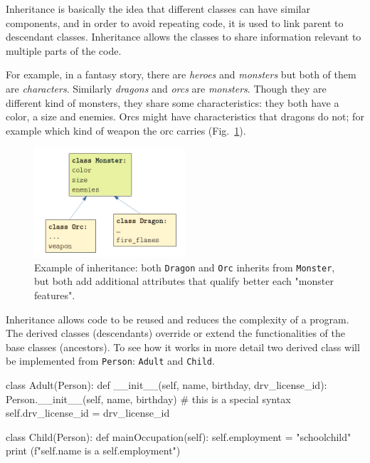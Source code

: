 Inheritance is basically the idea that different classes can have similar components, and in order to avoid repeating code, it is used to link parent to descendant classes. Inheritance allows the classes to share information relevant to multiple parts of the code.

For example, in a fantasy story, there are \emph{heroes} and \emph{monsters} but both of them are \emph{characters}. Similarly \emph{dragons} and \emph{orcs} are \emph{monsters}. Though they are different kind of monsters, they share some characteristics: they both have a color, a size and enemies. Orcs might have characteristics that dragons do not; for example which kind of weapon the orc carries (Fig.~\ref{fig:inheritance}). 

\begin{figure}[htbp]
  \centering
  \includegraphics[width=0.5\textwidth]{figures/inheritance}
  \caption{Example of inheritance: both \texttt{Dragon} and \texttt{Orc} inherits from \texttt{Monster}, but both add additional attributes that qualify better each "monster features".}
  \label{fig:inheritance}
\end{figure}

Inheritance allows code to be reused and reduces the complexity of a program. The derived classes (descendants) override or extend the functionalities of the base classes (ancestors). To see how it works in more detail two derived class will be implemented from \texttt{Person}: \texttt{Adult} and \texttt{Child}.

\begin{ipythonnon}
class Adult(Person):
    def __init__(self, name, birthday, drv_license_id):
        Person.__init__(self, name, birthday) # this is a special syntax
        self.drv_license_id = drv_license_id

class Child(Person):
    def mainOccupation(self):
        self.employment = "schoolchild"
        print (f"{self.name} is a {self.employment}")
\end{ipythonnon}


